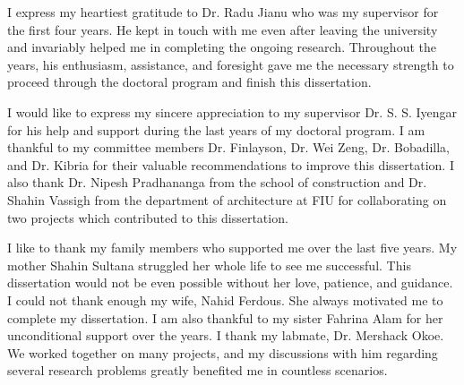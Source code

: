 \begin{acknowledgments}
I express my heartiest gratitude to Dr. Radu Jianu who was my supervisor for the first four years. He kept in touch with me even after leaving the university and invariably helped me in completing the ongoing research. Throughout the years, his enthusiasm, assistance, and foresight gave me the necessary strength to proceed through the doctoral program and finish this dissertation. 

I would like to express my sincere appreciation to my supervisor Dr.  S. S. Iyengar for his help and support during the last years of my doctoral program. I am thankful to my committee members Dr. Finlayson, Dr. Wei Zeng, Dr. Bobadilla, and Dr. Kibria for their valuable recommendations to improve this dissertation. I also thank Dr. Nipesh Pradhananga from the school of construction and Dr. Shahin Vassigh from the department of architecture at FIU for collaborating on two projects which contributed to this dissertation.

I like to thank my family members who supported me over the last five years. My mother Shahin Sultana struggled her whole life to see me successful. This dissertation would not be even possible without her love, patience, and guidance.  I could not thank enough my wife, Nahid Ferdous. She always motivated me to complete my dissertation. I am also thankful to my sister Fahrina Alam for her unconditional support over the years.  I thank my labmate, Dr. Mershack Okoe. We worked together on many projects, and my discussions with him regarding several research problems greatly benefited me in countless scenarios. 
\end{acknowledgments}